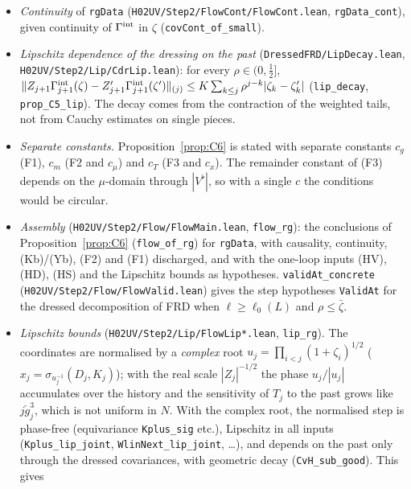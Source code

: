 \documentclass[11pt]{amsart}
\theoremstyle{definition}
\theoremstyle{remark}
\numberwithin{equation}{section}
\begin{document}
\begin{itemize}
  (\texttt{FlowSeq.past\_sum\_eq}, \texttt{tadT\_eq}), the bubble value (\texttt{bub\_line3}), the bilinear
  decay $|\mathfrak B(C'_k,C'_j)|\le KL^{-2(j-k)}$ (\texttt{bubX\_scale}) and line~1 of
  Proposition~\ref{prop:d2}, (HV) holds with $\beta=\frac{3\log L}{2\pi}$.
\item \emph{Continuity} of \texttt{rgData} (\texttt{H02UV/Step2/FlowCont/FlowCont.lean}, \texttt{rgData\_cont}), given
  continuity of $\Gamma^{\rm int}$ in $\zeta$ (\texttt{covCont\_of\_small}).
\item \emph{Lipschitz dependence of the dressing on the past}
  (\texttt{DressedFRD/LipDecay.lean}, \texttt{H02UV/Step2/Lip/CdrLip.lean}): for every $\rho\in(0,\frac12]$,
  $\|Z_{j+1}\Gamma^{\rm int}_{j+1}(\zeta)-Z'_{j+1}\Gamma^{\rm int}_{j+1}(\zeta')\|_{(j)}\le K\sum_{k\le j}\rho^{j-k}|\zeta_k-\zeta'_k|$
  (\texttt{lip\_decay}, \texttt{prop\_C5\_lip}). The decay comes from the contraction of the weighted tails, not
  from Cauchy estimates on single pieces.
\item \emph{Separate constants.} Proposition~\ref{prop:C6} is stated with separate constants $c_g$ (F1),
  $c_m$ (F2 and $c_\mu$) and $c_T$ (F3 and $c_x$). The remainder constant of (F3) depends on the
  $\mu$-domain through $|V^\flat|$, so with a single $c$ the conditions would be circular.
\item \emph{Assembly} (\texttt{H02UV/Step2/Flow/FlowMain.lean}, \texttt{flow\_rg}): the conclusions of
  Proposition~\ref{prop:C6} (\texttt{flow\_of\_rg}) for \texttt{rgData}, with causality, continuity,
  (Kb)/(Yb), (F2) and (F1) discharged, and with the one-loop inputs (HV), (HD), (HS) and the Lipschitz
  bounds as hypotheses. \texttt{validAt\_concrete} (\texttt{H02UV/Step2/Flow/FlowValid.lean}) gives the step
  hypotheses \texttt{ValidAt} for the dressed decomposition of FRD when $\ell\ge\ell_0(L)$ and
  $\rho\le\bar\zeta$.
\item \emph{Lipschitz bounds} (\texttt{H02UV/Step2/Lip/FlowLip*.lean}, \texttt{lip\_rg}). The coordinates are
  normalised by a \emph{complex} root $u_j=\prod_{i<j}(1+\zeta_i)^{1/2}$ ($x_j=\sigma_{u_j^{-1}}(D_j,K_j)$);
  with the real scale $|Z_j|^{-1/2}$ the phase $u_j/|u_j|$ accumulates over the history and the
  sensitivity of $T_j$ to the past grows like $j\check g_j^3$, which is not uniform in $N$. With the
  complex root, the normalised step is phase-free (equivariance \texttt{Kplus\_sig} etc.), Lipschitz in
  all inputs (\texttt{Kplus\_lip\_joint}, \texttt{WlinNext\_lip\_joint}, \ldots), and depends on the past
  only through the dressed covariances, with geometric decay (\texttt{CvH\_sub\_good}). This gives

\end{itemize}
\end{document}
